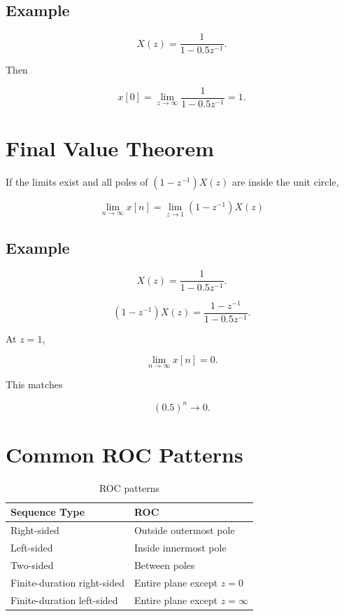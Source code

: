 \subsection{Example}

\[
X(z)=
\frac{1}{1-0.5z^{-1}}.
\]

Then

\[
x[0]=
\lim_{z\to\infty}
\frac{1}{1-0.5z^{-1}}
=1.
\]


\section{Final Value Theorem}

If the limits exist and all poles of \((1-z^{-1})X(z)\) are inside the unit circle,

\[
\boxed{
\lim_{n\to\infty}x[n]
=
\lim_{z\to1}(1-z^{-1})X(z)
}
\]


\subsection{Example}

\[
X(z)=
\frac{1}{1-0.5z^{-1}}.
\]

\[
(1-z^{-1})X(z)=
\frac{1-z^{-1}}{1-0.5z^{-1}}.
\]

At \(z=1\),

\[
\lim_{n\to\infty}x[n]=0.
\]

This matches

\[
(0.5)^n\to0.
\]


\section{Common ROC Patterns}

\begin{table}[H]
\centering
\caption{ROC patterns}
\begin{tabular}{|p{4cm}|p{5cm}|}
\hline
\textbf{Sequence Type} & \textbf{ROC}\\
\hline
Right-sided & Outside outermost pole\\
\hline
Left-sided & Inside innermost pole\\
\hline
Two-sided & Between poles\\
\hline
Finite-duration right-sided & Entire plane except \(z=0\)\\
\hline
Finite-duration left-sided & Entire plane except \(z=\infty\)\\
\hline
\end{tabular}
\end{table}

